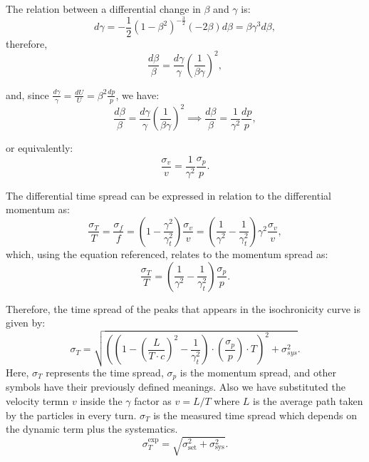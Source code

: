 The relation between a differential change in $\beta$ and $\gamma$ is:
\begin{equation}\label{eq:apdx6:dgamma}
d\gamma = -\frac{1}{2}\left(1 - \beta^2\right)^{-\frac{3}{2}}(-2\beta)d\beta = \beta\gamma^3 d\beta,
\end{equation}
therefore,
\begin{equation}\label{eq:apdx6:dbeta1}
\frac{d\beta}{\beta} = \frac{d\gamma}{\gamma} \left(\frac{1}{\beta\gamma}\right)^2,
\end{equation}

and, since \(\frac{d\gamma}{\gamma} = \frac{dU}{U} = \beta^2 \frac{dp}{p}\), we have:
\begin{equation}\label{eq:apdx6:dbeta}
\frac{d\beta}{\beta} = \frac{d\gamma}{\gamma} \left(\frac{1}{\beta\gamma}\right)^2 \implies \frac{d\beta}{\beta} = \frac{1}{\gamma^2}\frac{dp}{p},
\end{equation}

or equivalently:
\begin{equation}\label{eq:apdx6:sigma_v}
\frac{\sigma_v}{v} = \frac{1}{\gamma^2}\frac{\sigma_{p}}{p}.
\end{equation}

The differential time spread can be expressed in relation to the differential momentum as:
\begin{equation}\label{eq:apdx6:sigma_T}
\frac{\sigma_T}{T} = \frac{\sigma_f}{f} = \left(1 - \frac{\gamma^2}{\gamma_t^2}\right)\frac{\sigma_v}{v} = \left(\frac{1}{\gamma^2} - \frac{1}{\gamma_t^2}\right)\gamma^2\frac{\sigma_v}{v},
\end{equation}
 which, using the equation referenced, relates to the momentum spread as:
\begin{equation}\label{eq:apdx6:sigma_T_sigma_p}
\frac{\sigma_T}{T} = \left(\frac{1}{\gamma^2} - \frac{1}{\gamma_t^2}\right)\frac{\sigma_{p}}{p}.
\end{equation}

Therefore, the time spread of the peaks that appears in the isochronicity curve is given by:
\begin{equation}\label{eq:apdx6:sigma_T_final}
\sigma_T = \sqrt{\left(\left(1 - \left(\frac{L}{T \cdot c }\right)^2 - \frac{1}{\gamma_t^2}\right)\cdot\left(\frac{\sigma_p}{p}\right)\cdot T\right)^2 + \sigma_{sys}^2}.
\end{equation}
Here, \(\sigma_T\) represents the time spread, \(\sigma_p\) is the momentum spread, and other symbols have their previously defined meanings. Also we have substituted the velocity termn $v$ inside the $\gamma$ factor as $v = L / T$ where $L$ is the average path taken by the particles in every turn.
$\sigma_T$ is the measured time spread which depends on the dynamic term plus the systematics.
\begin{equation}\label{eq:apdx6:sigma_T_final2}
\sigma_T^{\text{exp}} = \sqrt{\sigma_\text{set}^{2} + \sigma_{\text{sys}}^2}.
\end{equation}

